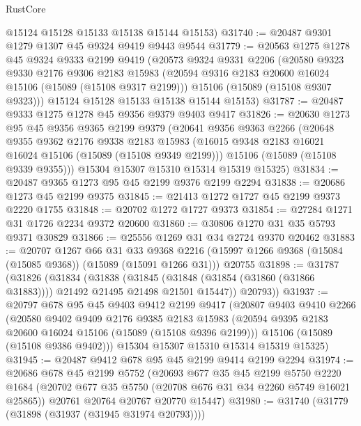 \begin{lexlean}{RustCore}
\begin{coremodule}
      @15124
      @15128
      @15133
      @15138
      @15144
      @15153)
@31740 := @20487 @9301 @1279 @1307 @45 @9324 @9419 @9443 @9544
@31779 := @20563
    @1275
    @1278
    @45
    @9324
    @9333
    @2199
    @9419
    (@20573
      @9324
      @9331
      @2206
      (@20580
        @9323
        @9330
        @2176
        @9306
        @2183
        @15983
        (@20594 @9316 @2183 @20600 @16024 @15106 (@15089 (@15108 @9317 @2199)))
        @15106
        (@15089 (@15108 @9307 @9323)))
      @15124
      @15128
      @15133
      @15138
      @15144
      @15153)
@31787 := @20487 @9333 @1275 @1278 @45 @9356 @9379 @9403 @9417
@31826 := @20630
    @1273
    @95
    @45
    @9356
    @9365
    @2199
    @9379
    (@20641
      @9356
      @9363
      @2266
      (@20648
        @9355
        @9362
        @2176
        @9338
        @2183
        @15983
        (@16015 @9348 @2183 @16021 @16024 @15106 (@15089 (@15108 @9349 @2199)))
        @15106
        (@15089 (@15108 @9339 @9355)))
      @15304
      @15307
      @15310
      @15314
      @15319
      @15325)
@31834 := @20487 @9365 @1273 @95 @45 @2199 @9376 @2199 @2294
@31838 := @20686 @1273 @45 @2199 @9375
@31845 := @21413 @1272 @1727 @45 @2199 @9373 @2220 @1755
@31848 := @20702 @1272 @1727 @9373
@31854 := @27284 @1271 @31 @1726 @2234 @9372 @20600
@31860 := @30806 @1270 @31 @35 @5793 @9371 @30829
@31866 := @25556 @1269 @31 @34 @2724 @9370 @20462
@31883 := @20707
    @1267
    @66
    @31
    @33
    @9368
    @2216
    (@15997 @1266 @9368 (@15084 (@15085 @9368)) (@15089 (@15091 @1266 @31)))
    @20755
@31898 := @31787
    (@31826
      (@31834
        (@31838
          (@31845 (@31848 (@31854 (@31860 (@31866 @31883)))) @21492 @21495 @21498 @21501 @15447))
        @20793))
@31937 := @20797
    @678
    @95
    @45
    @9403
    @9412
    @2199
    @9417
    (@20807
      @9403
      @9410
      @2266
      (@20580
        @9402
        @9409
        @2176
        @9385
        @2183
        @15983
        (@20594 @9395 @2183 @20600 @16024 @15106 (@15089 (@15108 @9396 @2199)))
        @15106
        (@15089 (@15108 @9386 @9402)))
      @15304
      @15307
      @15310
      @15314
      @15319
      @15325)
@31945 := @20487 @9412 @678 @95 @45 @2199 @9414 @2199 @2294
@31974 := @20686
    @678
    @45
    @2199
    @5752
    (@20693
      @677
      @35
      @45
      @2199
      @5750
      @2220
      @1684
      (@20702 @677 @35 @5750 (@20708 @676 @31 @34 @2260 @5749 @16021 @25865))
      @20761
      @20764
      @20767
      @20770
      @15447)
@31980 := @31740 (@31779 (@31898 (@31937 (@31945 @31974 @20793))))

\end{coremodule}
\end{lexlean}
